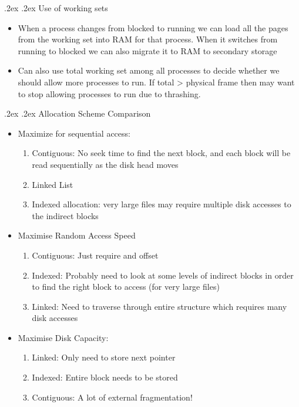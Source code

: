 \documentclass[13pt,landscape,a4paper]{article}
\makeatletter
\renewcommand{\subsection}{\@startsection{subsection}{1}{0mm}%
    {.2ex}%
    {.2ex}%
    {\sffamily\bfseries}}
\makeatother
\begin{document}
\begin{multicols*}{3}
        \subsection{Use of working sets}
        \begin{itemize}
            \item When a process changes from blocked to running we can load all the pages from the working set into RAM for that process. When it switches from running to blocked we can also migrate it to RAM to secondary storage
            \item Can also use total working set among all processes to decide whether we should allow more processes to run. If total > physical frame then may want to stop allowing processes to run due to thrashing.
        \end{itemize}
        \subsection{Allocation Scheme Comparison}
        \begin{itemize}
            \item Maximize for sequential access:
            \begin{enumerate}
                \item Contiguous: No seek time to find the next block, and each block will be read sequentially as the disk head moves
                \item Linked List
                \item Indexed allocation: very large files may require multiple disk accesses to the indirect blocks
            \end{enumerate}
            \item Maximise Random Access Speed
            \begin{enumerate}
                \item Contiguous: Just require and offset
                \item Indexed: Probably need to look at some levels of indirect blocks in order to find the right block to access (for very large files)
                \item Linked: Need to traverse through entire structure which requires many disk accesses
            \end{enumerate}
            \item Maximise Disk Capacity:
            \begin{enumerate}
                \item Linked: Only need to store next pointer
                \item Indexed: Entire block needs to be stored
                \item Contiguous: A lot of external fragmentation!
            \end{enumerate}
        \end{itemize}
    \end{multicols*}
\end{document}
